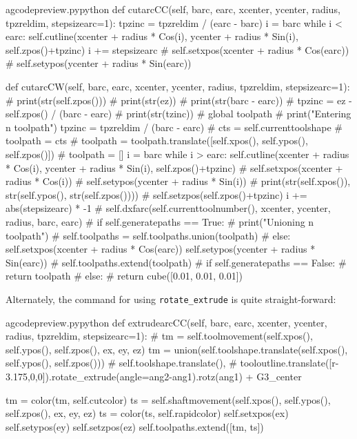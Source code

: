 \documentclass{ltxdoc}
\begin{document}
\lstset{firstnumber=\thegcpy}
\begin{writecode}{a}{gcodepreview.py}{python}
    def cutarcCC(self, barc, earc, xcenter, ycenter, radius, tpzreldim, stepsizearc=1):
        tpzinc = tpzreldim / (earc - barc)
        i = barc
        while i < earc: 
            self.cutline(xcenter + radius * Cos(i), ycenter + radius * Sin(i), self.zpos()+tpzinc)
            i += stepsizearc
#        self.setxpos(xcenter + radius * Cos(earc))
#        self.setypos(ycenter + radius * Sin(earc))

    def cutarcCW(self, barc, earc, xcenter, ycenter, radius, tpzreldim, stepsizearc=1):
#        print(str(self.zpos()))
#        print(str(ez))
#        print(str(barc - earc))
#        tpzinc = ez - self.zpos() / (barc - earc)
#        print(str(tzinc))
#        global toolpath
#        print("Entering n toolpath")
        tpzinc = tpzreldim / (barc - earc)
#        cts = self.currenttoolshape
#        toolpath = cts
#        toolpath = toolpath.translate([self.xpos(), self.ypos(), self.zpos()])
#        toolpath = []
        i = barc
        while i > earc: 
            self.cutline(xcenter + radius * Cos(i), ycenter + radius * Sin(i), self.zpos()+tpzinc)
#            self.setxpos(xcenter + radius * Cos(i))
#            self.setypos(ycenter + radius * Sin(i))
#            print(str(self.xpos()), str(self.ypos(), str(self.zpos())))
#            self.setzpos(self.zpos()+tpzinc)
            i += abs(stepsizearc) * -1
#        self.dxfarc(self.currenttoolnumber(), xcenter, ycenter, radius, barc, earc)
#        if self.generatepaths == True:
#            print("Unioning n toolpath")
#            self.toolpaths = self.toolpaths.union(toolpath)
#        else:
        self.setxpos(xcenter + radius * Cos(earc))
        self.setypos(ycenter + radius * Sin(earc))
#        self.toolpaths.extend(toolpath)
#        if self.generatepaths == False:
#        return toolpath
#        else:
#            return cube([0.01, 0.01, 0.01])

\end{writecode}
\addtocounter{gcpy}{43}

Alternately, the command for using \verb|rotate_extrude| is quite straight-forward:

\lstset{firstnumber=\thegcpy}
\begin{writecode}{a}{gcodepreview.py}{python}
    def extrudearcCC(self, barc, earc, xcenter, ycenter, radius, tpzreldim, stepsizearc=1):
#        tm = self.toolmovement(self.xpos(), self.ypos(), self.zpos(), ex, ey, ez)
        tm = union(self.toolshape.translate(self.xpos(), self.ypos(), self.zpos()))
#                   self.toolshape.translate(),
#                   tooloutline.translate([r-3.175,0,0]).rotate_extrude(angle=ang2-ang1).rotz(ang1) + G3_center

        tm = color(tm, self.cutcolor)
        ts = self.shaftmovement(self.xpos(), self.ypos(), self.zpos(), ex, ey, ez)
        ts = color(ts, self.rapidcolor)
        self.setxpos(ex)
        self.setypos(ey)
        self.setzpos(ez)
        self.toolpaths.extend([tm, ts])

\end{writecode}
\addtocounter{gcpy}{14}
\end{document}
